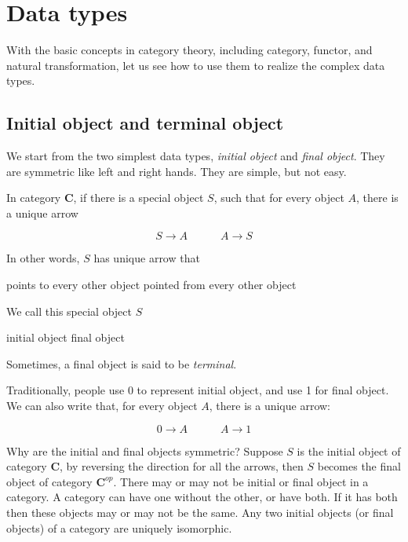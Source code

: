 \documentclass{article}
\begin{document}
\section{Data types}

With the basic concepts in category theory, including category, functor, and natural transformation, let us see how to use them to realize the complex data types.

\subsection{Initial object and terminal object}
We start from the two simplest data types, {\em initial object} and {\em final object}. They are symmetric like left and right hands. They are simple, but not easy.

 
\begin{definition}
\normalfont
In category $\pmb{C}$, if there is a special object $S$, such that for every object $A$, there is a unique arrow

\[
  S \longrightarrow A \quad \quad \quad A \longrightarrow S
\]

In other words, $S$ has unique arrow that

\begin{center}
  points to every other object  \quad \quad \quad pointed from every other object
\end{center}

We call this special object $S$

\begin{center}
  initial object \quad \quad \quad final object
\end{center}

Sometimes, a final object is said to be {\em terminal}.
\end{definition}

Traditionally, people use 0 to represent initial object, and use 1 for final object. We can also write that, for every object $A$, there is a unique arrow:

\[
  0 \longrightarrow A \quad \quad \quad A \longrightarrow 1
\]

Why are the initial and final objects symmetric? Suppose $S$ is the initial object of category $\pmb{C}$, by reversing the direction for all the arrows, then $S$ becomes the final object of category $\pmb{C}^{op}$. There may or may not be initial or final object in a category. A category can have one without the other, or have both. If it has both then these objects may or may not be the same. Any two initial objects (or final objects) of a category are uniquely isomorphic.
\end{document}
